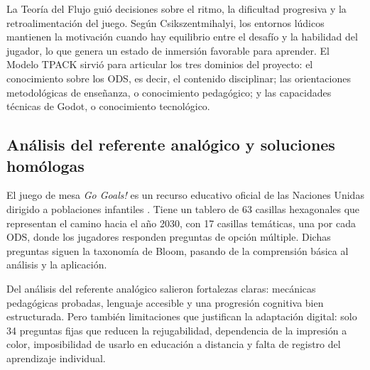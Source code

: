 \documentclass[12pt,a4paper]{article}
\begin{document}
La Teoría del Flujo \citep{Csikszentmihalyi1990} guió decisiones sobre el ritmo, la dificultad progresiva y la retroalimentación del juego. Según Csikszentmihalyi, los entornos lúdicos mantienen la motivación cuando hay equilibrio entre el desafío y la habilidad del jugador, lo que genera un estado de inmersión favorable para aprender. El Modelo TPACK \citep{MishraKoehler2006} sirvió para articular los tres dominios del proyecto: el conocimiento sobre los ODS, es decir, el contenido disciplinar; las orientaciones metodológicas de enseñanza, o conocimiento pedagógico; y las capacidades técnicas de Godot, o conocimiento tecnológico.

%

\subsection{Análisis del referente analógico y soluciones homólogas}

El juego de mesa \textit{Go Goals!} es un recurso educativo oficial de las Naciones Unidas dirigido a poblaciones infantiles \citep{GoGoals2020}. Tiene un tablero de 63 casillas hexagonales que representan el camino hacia el año 2030, con 17 casillas temáticas, una por cada ODS, donde los jugadores responden preguntas de opción múltiple. Dichas preguntas siguen la taxonomía de Bloom, pasando de la comprensión básica al análisis y la aplicación.

Del análisis del referente analógico salieron fortalezas claras: mecánicas pedagógicas probadas, lenguaje accesible y una progresión cognitiva bien estructurada. Pero también limitaciones que justifican la adaptación digital: solo 34 preguntas fijas que reducen la rejugabilidad, dependencia de la impresión a color, imposibilidad de usarlo en educación a distancia y falta de registro del aprendizaje individual.
\end{document}
